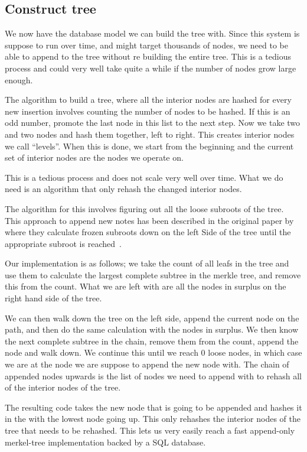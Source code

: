 \documentclass[../Main/thesis.tex]{subfiles}
\begin{document}
\subsection*{Construct tree}%
\label{sub:construct_tree}
We now have the database model we can build the tree with. Since this system is
suppose to run over time, and might target thousands of nodes, we need to be
able to append to the tree without re building the entire tree. This is a
tedious process and could very well take quite a while if the number of nodes
grow large enough.

The algorithm to build a tree, where all the interior nodes are hashed for every
new insertion involves counting the number of nodes to be hashed. If this is an
odd number, promote the last node in this list to the next step. Now we take two
and two nodes and hash them together, left to right. This creates interior nodes
we call ``levels''. When this is done, we start from the beginning and the
current set of interior nodes are the nodes we operate on.

This is a tedious process and does not scale very well over time. What we do
need is an algorithm that only rehash the changed interior nodes.

The algorithm for this involves figuring out all the loose subroots of the tree.
This approach to append new notes has been described in the original paper
by~\citeauthor{182788} where they calculate frozen subroots down on the left
Side of the tree until the appropriate subroot is reached~\cite{182788}.

Our implementation is as follows; we take the count of all leafs in the tree and
use them to calculate the largest complete subtree in the merkle tree, and
remove this from the count.  What we are left with are all the nodes in surplus
on the right hand side of the tree.

We can then walk down the tree on the left side, append the current node on the
path, and then do the same calculation with the nodes in surplus. We then know
the next complete subtree in the chain, remove them from the count, append the
node and walk down. We continue this until we reach 0 loose nodes, in which case
we are at the node we are suppose to append the new node with. The chain of
appended nodes upwards is the list of nodes we need to append with to rehash all
of the interior nodes of the tree.

The resulting code takes the new node that is going to be appended and hashes it
in the with the lowest node going up. This only rehashes the interior nodes of
the tree that needs to be rehashed. This lets us very easily reach a fast
append-only merkel-tree implementation backed by a SQL database.
\end{document}

